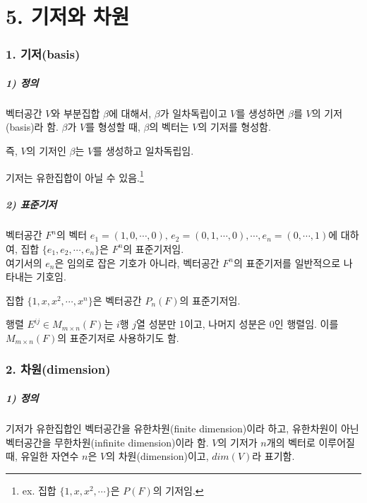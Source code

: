 \newpage


\part*{5. 기저와 차원}

\section*{1. 기저(basis)}

\subsubsection*{1) 정의\\}
\begin{DEF}
벡터공간 $V$와 부분집합 $\beta$에 대해서, $\beta$가 일차독립이고 $V$를 생성하면 $\beta$를 $V$의 기저(basis)라 함. $\beta$가 $V$를 형성할 때, $\beta$의 벡터는 $V$의 기저를 형성함.
\end{DEF}

즉, $V$의 기저인 $\beta$는 $V$를 생성하고 일차독립임.

기저는 유한집합이 아닐 수 있음.\footnote{ex. 집합 $\{1,x,x^2, \cdots \}$은 $P(F)$의 기저임.}


\subsubsection*{2) 표준기저}
벡터공간 $F^n$의 벡터 $e_1=(1,0, \cdots ,0),\,e_2=(0,1, \cdots ,0), \cdots ,e_n=(0, \cdots ,1)$에 대하여, 집합 $\{e_1,e_2, \cdots ,e_n\}$은 $F^n$의 표준기저임.\\
여기서의 $e_n$은 임의로 잡은 기호가 아니라, 벡터공간 $F^n$의 표준기저를 일반적으로 나타내는 기호임.

집합 $\{1,x,x^2, \cdots ,x^n\}$은 벡터공간 $P_n(F)$의 표준기저임.

행렬 $E^{ij} \in M_{m \times n}(F)$는 $i$행 $j$열 성분만 1이고, 나머지 성분은 0인 행렬임. 이를 $M_{m \times n}(F)$의 표준기저로 사용하기도 함.\\


\section*{2. 차원(dimension)}
\subsubsection*{1) 정의\\}
\begin{DEF}
기저가 유한집합인 벡터공간을 유한차원(finite dimension)이라 하고, 유한차원이 아닌 벡터공간을 무한차원(infinite dimension)이라 함. $V$의 기저가 $n$개의 벡터로 이루어질 때, 유일한 자연수 $n$은 $V$의 차원(dimension)이고, $dim(V)$라 표기함.
\end{DEF}

